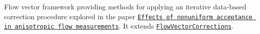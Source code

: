 Flow vector framework providing methods for applying an iterative data-\/based correction procedure explored in the paper \href{https://journals.aps.org/prc/abstract/10.1103/PhysRevC.77.034904}{\tt Effects of nonuniform acceptance in anisotropic flow measurements}. It extends \href{https://github.com/FlowCorrections/FlowVectorCorrections}{\tt Flow\+Vector\+Corrections}. 